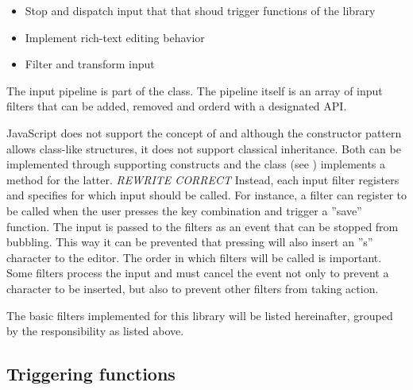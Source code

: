 \begin{itemize}
\item Stop and dispatch input that that shoud trigger functions of the library
\item Implement rich-text editing behavior
\item Filter and transform input
\end{itemize}

The input pipeline is part of the  class. The pipeline itself is an array of input filters that can be added, removed and orderd with a designated API.

JavaScript does not support the concept of  and although the constructor pattern allows class-like structures, it does not support classical inheritance. Both can be implemented through supporting constructs and the  class (see ) implements a method for the latter. \textit{REWRITE CORRECT} Instead, each input filter registers and specifies for which input should be called. For instance, a filter can register to be called when the user presses the  key combination and trigger a ''save'' function. The input is passed to the filters as an event that can be stopped from bubbling. This way it can be prevented that pressing  will also insert an ''s'' character to the editor. The order in which filters will be called is important. Some filters process the input and must cancel the event not only to prevent a character to be inserted, but also to prevent other filters from taking action.


The basic filters implemented for this library will be listed hereinafter, grouped by the responsibility as listed above.





\subsection{Triggering functions}

